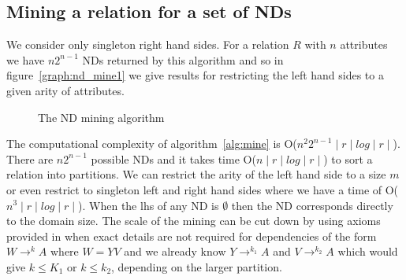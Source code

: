 \subsection{Mining a relation for a set of NDs}

We consider only singleton right hand sides. For a relation $R$ with
$n$ attributes we have $n 2^{n-1}$ NDs returned by this algorithm and
so in figure~\ref{graph:nd_mine1} we give results for restricting the
left hand sides to a given arity of attributes.

\medskip

{\renewcommand{\baselinestretch}{1}
\begin{figure}[ht]
\begin{center}
\end{center}
\caption{\label{numdep:fig:nd_mine} The ND mining algorithm}
\end{figure}
}

The computational complexity of algorithm~\ref{alg:mine} is O($n^2 2^{n-1}
\mid r \mid log \mid r \mid$). There are $n2^{n-1}$ possible NDs and
it takes time O($n \mid r \mid log \mid r \mid$) to sort a relation into
partitions. We can restrict the arity of the left hand side to a size
$m$ or even restrict to singleton left and right
hand sides where we have a time of O($n^3\mid r \mid log \mid r \mid$).
When the lhs of any ND is $\emptyset$ then the ND corresponds
directly to the domain size.
The scale of the mining can be cut down by using axioms provided
in \cite{gm85b,gm85a} when exact details are not required for
dependencies of the form $W \to^k A$ where $W = YV$ and we already
know $Y \to^{k_1} A$ and $V \to^{k_2} A$ which would give $k \le K_1$
or $k \le k_2$, depending on the larger partition. 


